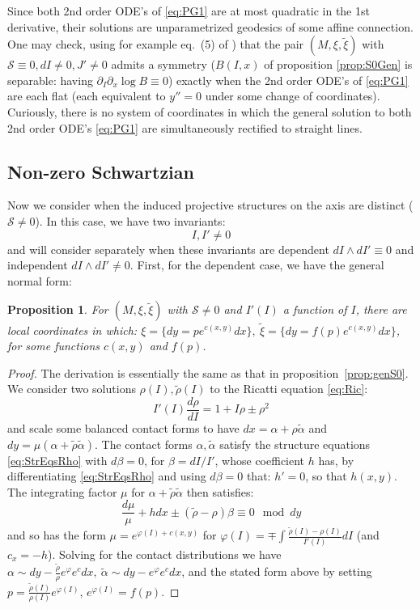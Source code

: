\documentclass[10pt]{amsart}
\newcommand{\fe}{\varphi}
\newcommand{\del}{\partial}
\newtheorem{prop}[thm]{Proposition}
\theoremstyle{definition}
\begin{document}
   Since both 2nd order ODE's of \eqref{eq:PG1} are at most quadratic in the 1st derivative, their solutions are unparametrized geodesics of some affine connection. One may check, using for example eq.~(5) of \cite{BGH}) that the pair $(M, \xi, \tilde\xi)$ with $\mathcal{S}\equiv 0, dI\ne 0, J'\ne 0$ admits a symmetry ($B(I,x)$ of proposition \ref{prop:S0Gen} is separable: having $\del_I\del_x \log  B \equiv 0$) exactly when the 2nd order ODE's of \eqref{eq:PG1} are each flat (each equivalent to $y'' = 0$ under some change of coordinates). Curiously, there is no system of coordinates in which the general solution to both 2nd order ODE's \eqref{eq:PG1} are simultaneously rectified to straight lines.



\subsection{Non-zero Schwartzian} Now we consider when the induced projective structures on the axis are distinct ($\mathcal{S}\ne 0$). In this case, we have two invariants:
\[ I, I' \ne 0 \]
and will consider separately when these invariants are dependent $dI\wedge dI'\equiv 0$ and independent $dI\wedge dI'\ne 0$. First, for the dependent case, we have the general normal form:

\begin{prop}\label{prop:DepGenlnf}
    For $(M, \xi, \tilde \xi)$ with $\mathcal{S}\ne 0$ and $I'(I)$ a function of $I$, there are local coordinates in which: $\xi = \{ dy = p e^{c(x,y)}dx \}, ~\tilde \xi = \{ dy = f(p) e^{c(x,y)}dx\}$,
    for some functions $c(x,y)$ and $f(p)$.
\end{prop}

\begin{proof} The derivation is essentially the same as that in proposition~\ref{prop:genS0}. 
 We consider two solutions $\rho(I), \tilde\rho(I)$ to the Ricatti equation \eqref{eq:Ric}:
 \[ I'(I) \frac{d\rho}{dI} = 1 + I\rho \pm \rho^2 \]
 and scale some balanced contact forms to have $dx = \alpha + \rho \tilde\alpha$ and $dy = \mu( \alpha + \tilde\rho \tilde\alpha)$. The contact forms $\alpha, \tilde\alpha$ satisfy the structure equations \eqref{eq:StrEqsRho} with $d\beta = 0$, for $\beta = dI/I'$, whose coefficient $h$ has, by differentiating \eqref{eq:StrEqsRho} and using $d\beta = 0$ that: $h' = 0$, so that $h(x,y)$. The integrating factor $\mu$ for $\alpha + \tilde\rho\tilde\alpha$ then satisfies:
 \[ \frac{d\mu}{\mu} + hdx \pm (\tilde\rho - \rho)\beta \equiv 0 \mod dy \]
 and so has the form $\mu = e^{\fe(I) + c(x,y)}$ for $\fe(I) = \mp \int \frac{\tilde\rho(I) - \rho(I)}{I'(I)} dI$ (and $c_x = - h$). Solving for the contact distributions we have $\alpha \sim dy - \frac{\tilde\rho}{\rho}e^\fe e^c dx, ~\tilde\alpha \sim dy - e^\fe e^c dx$, and the stated form above by setting $p = \frac{\tilde\rho(I)}{\rho(I)}e^{\fe(I)}$, $e^{\fe(I)} = f(p)$.
\end{proof}
\end{document}
